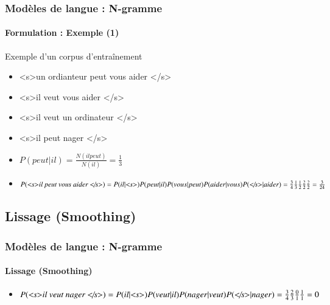 \documentclass[xcolor=table]{beamer}
\begin{document}
\begin{frame}
\frametitle{Modèles de langue : N-gramme}
\framesubtitle{Formulation : Exemple (1)}

\begin{exampleblock}{Exemple d'un corpus d'entraînement}
	\begin{itemize}
		\item \textless s\textgreater un ordianteur peut vous aider \textless/s\textgreater
		\item \textless s\textgreater il veut vous aider \textless/s\textgreater
		\item \textless s\textgreater il veut un ordinateur \textless/s\textgreater
		\item \textless s\textgreater il peut nager \textless/s\textgreater
	\end{itemize}
\end{exampleblock}

\begin{itemize}
	\item $P(peut | il) = \frac{N(il peut)}{N(il)} = \frac{1}{3}$
	\item $P(\text{\textit{\textless s\textgreater il peut vous aider \textless/s\textgreater}}) = 
	P(il|\text{\textit{\textless s\textgreater}}) P(peut|il) P(vous|peut) P(aider|vous) P(\text{\textit{\textless/s\textgreater}}|aider) = 
	\frac{3}{4} \frac{1}{3} \frac{1}{2} \frac{2}{2} \frac{2}{2} = \frac{3}{24}
	$
\end{itemize}


\end{frame}

\subsection{Lissage (Smoothing)}

\begin{frame}
\frametitle{Modèles de langue : N-gramme}
\framesubtitle{Lissage (Smoothing)}

\begin{itemize}
	\item $P(\text{\textit{\textless s\textgreater il veut nager \textless/s\textgreater}}) = 
	P(il|\text{\textit{\textless s\textgreater}}) P(veut|il) P(nager|veut)  P(\text{\textit{\textless/s\textgreater}}|nager) = 
	\frac{3}{4} \frac{2}{3} \frac{0}{1} \frac{1}{1} = 0
	$
\end{itemize}

\end{frame}
\end{document}
